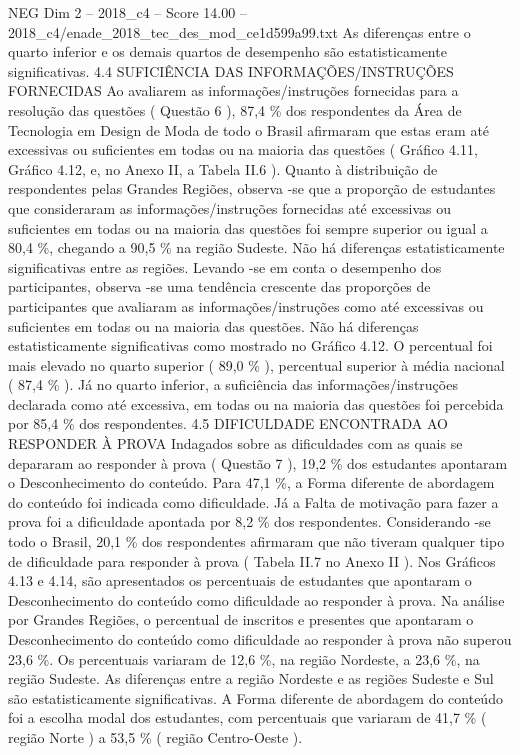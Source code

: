 \begin{textsample}{NEG Dim 2 – 2018\_c4 – Score 14.00 – 2018\_c4/enade\_2018\_tec\_des\_mod\_ce1d599a99.txt}
As diferenças entre o quarto inferior e os demais quartos de desempenho são estatisticamente significativas. 4.4 SUFICIÊNCIA DAS INFORMAÇÕES/INSTRUÇÕES FORNECIDAS Ao avaliarem as informações/instruções fornecidas para a resolução das questões ( Questão 6 ), 87,4 \% dos respondentes da Área de Tecnologia em Design de Moda de todo o Brasil afirmaram que estas eram até excessivas ou suficientes em todas ou na maioria das questões ( Gráfico 4.11, Gráfico 4.12, e, no Anexo II, a Tabela II.6 ).
Quanto à distribuição de respondentes pelas Grandes Regiões, observa -se que a proporção de estudantes que consideraram as informações/instruções fornecidas até excessivas ou suficientes em todas ou na maioria das questões foi sempre superior ou igual a 80,4 \%, chegando a 90,5 \% na região Sudeste.
Não há diferenças estatisticamente significativas entre as regiões.
Levando -se em conta o desempenho dos participantes, observa -se uma tendência crescente das proporções de participantes que avaliaram as informações/instruções como até excessivas ou suficientes em todas ou na maioria das questões.
Não há diferenças estatisticamente significativas como mostrado no Gráfico 4.12.
O percentual foi mais elevado no quarto superior ( 89,0 \% ), percentual superior à média nacional ( 87,4 \% ).
Já no quarto inferior, a suficiência das informações/instruções declarada como até excessiva, em todas ou na maioria das questões foi percebida por 85,4 \% dos respondentes. 4.5 DIFICULDADE ENCONTRADA AO RESPONDER À PROVA Indagados sobre as dificuldades com as quais se depararam ao responder à prova ( Questão 7 ), 19,2 \% dos estudantes apontaram o Desconhecimento do conteúdo.
Para 47,1 \%, a Forma diferente de abordagem do conteúdo foi indicada como dificuldade.
Já a Falta de motivação para fazer a prova foi a dificuldade apontada por 8,2 \% dos respondentes.
Considerando -se todo o Brasil, 20,1 \% dos respondentes afirmaram que não tiveram qualquer tipo de dificuldade para responder à prova ( Tabela II.7 no Anexo II ).
Nos Gráficos 4.13 e 4.14, são apresentados os percentuais de estudantes que apontaram o Desconhecimento do conteúdo como dificuldade ao responder à prova.
Na análise por Grandes Regiões, o percentual de inscritos e presentes que apontaram o Desconhecimento do conteúdo como dificuldade ao responder à prova não superou 23,6 \%.
Os percentuais variaram de 12,6 \%, na região Nordeste, a 23,6 \%, na região Sudeste.
As diferenças entre a região Nordeste e as regiões Sudeste e Sul são estatisticamente significativas.
A Forma diferente de abordagem do conteúdo foi a escolha modal dos estudantes, com percentuais que variaram de 41,7 \% ( região Norte ) a 53,5 \% ( região Centro-Oeste ).

\end{textsample}
